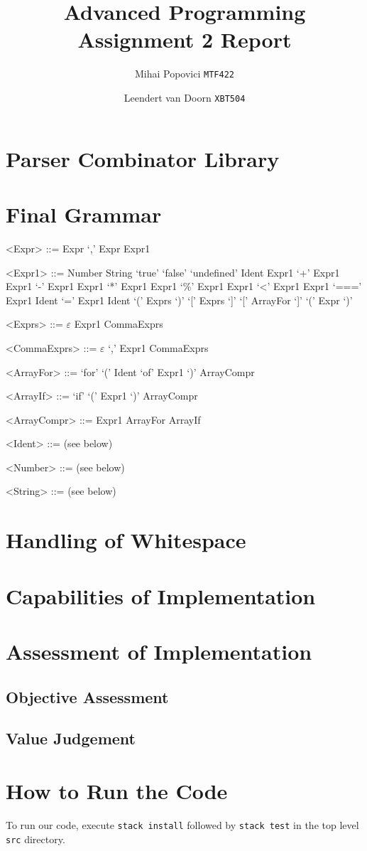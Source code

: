 \documentclass{article}
\title{Advanced Programming Assignment 2 Report}
\author{Mihai Popovici \texttt{MTF422} \and Leendert van Doorn \texttt{XBT504}}
\begin{document}
\maketitle




\section{Parser Combinator Library}


\section{Final Grammar}

\begin{grammar}
	<Expr> ::= Expr `,' Expr
	\alt Expr1
	
	<Expr1> ::= Number
	\alt String
	\alt `true'
	\alt `false'
	\alt `undefined'
	\alt Ident
	\alt Expr1 `+' Expr1
	\alt Expr1 `-' Expr1
	\alt Expr1 `*' Expr1
	\alt Expr1 `\%' Expr1
	\alt Expr1 `<' Expr1
	\alt Expr1 `===' Expr1
	\alt Ident `=' Expr1
	\alt Ident `(' Exprs `)'
	\alt `[' Exprs `]'
	\alt `[' ArrayFor `]'
	\alt `(' Expr `)'
	
	<Exprs> ::= $\varepsilon$
	\alt Expr1 CommaExprs	
	
	<CommaExprs> ::= $\varepsilon$
	\alt `,' Expr1 CommaExprs
	
	<ArrayFor> ::= `for' `(' Ident `of' Expr1 `)' ArrayCompr
	
	<ArrayIf> ::= `if' `(' Expr1 `)' ArrayCompr
	
	<ArrayCompr> ::= Expr1
	\alt ArrayFor
	\alt ArrayIf
	
	<Ident> ::= (see below)
	
	<Number> ::= (see below)
	
	<String> ::= (see below)
\end{grammar}


\section{Handling of Whitespace}


\section{Capabilities of Implementation}


\section{Assessment of Implementation}
\subsection{Objective Assessment}


\subsection{Value Judgement}


\section{How to Run the Code}
To run our code, execute \texttt{stack install} followed by \texttt{stack test} in the top level \texttt{src} directory.
\end{document}
